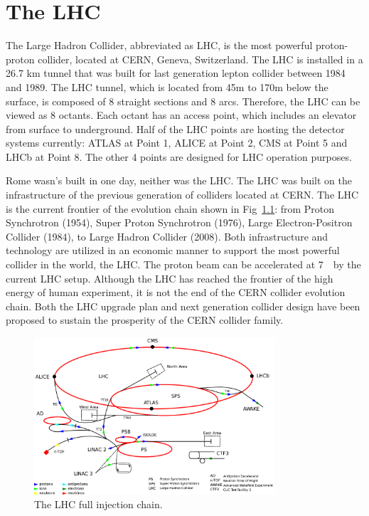 \chapter{The LHC}
\label{ch:lhc}
\par The Large Hadron Collider, abbreviated as LHC, is the most powerful proton-proton collider, located at CERN, Geneva, Switzerland. The LHC is installed in a 26.7 km tunnel that was built for last generation lepton collider between 1984 and 1989. The LHC tunnel, which is located from 45m to 170m below the surface, is composed of 8 straight sections and 8 arcs. Therefore, the LHC can be viewed as 8 octants. Each octant has an access point, which includes an elevator from surface to underground. Half of the LHC points are hosting the detector systems currently: ATLAS\cite{Aad:2008zzm} at Point 1, ALICE\cite{Aamodt:2008zz} at Point 2, CMS\cite{Chatrchyan:2008aa} at Point 5 and LHCb\cite{Alves:2008zz} at Point 8. The other 4 points are designed for LHC operation purposes.

\par Rome wasn's built in one day, neither was the LHC. The LHC was built on the infrastructure of the previous generation of colliders located at CERN. The LHC is the current frontier of the evolution chain shown in Fig~\ref{fig:c3cernaccs}: from Proton Synchrotron (1954)\cite{Gilardoni:2011za}, Super Proton Synchrotron (1976)\cite{Doble:2017syb}, Large Electron-Positron Collider (1984)\cite{LepInjectorStudy:1983aa}\cite{LepInjectorStudy:1983ab}, to Large Hadron Collider (2008)\cite{Bruning:2004ej}\cite{Buning:2004wk}. Both infrastructure and technology are utilized in an economic manner to support the most powerful collider in the world, the LHC. The proton beam can be accelerated at 7~\TeV~by the current LHC setup. Although the LHC has reached the frontier of the high energy of human experiment, it is not the end of the CERN collider evolution chain. Both the LHC upgrade plan\cite{ApollinariG.:2017ojx} and next generation collider design\cite{Benedikt:2018csr} have been proposed to sustain the prosperity of the CERN collider family.

\begin{figure}[htbp]
    \centering
    \includegraphics[width=0.8\textwidth]{chapters/c3/figures/cern-accelerator-complex.png}
    \caption{The LHC full injection chain.}
    \label{fig:c3cernaccs}
\end{figure}

